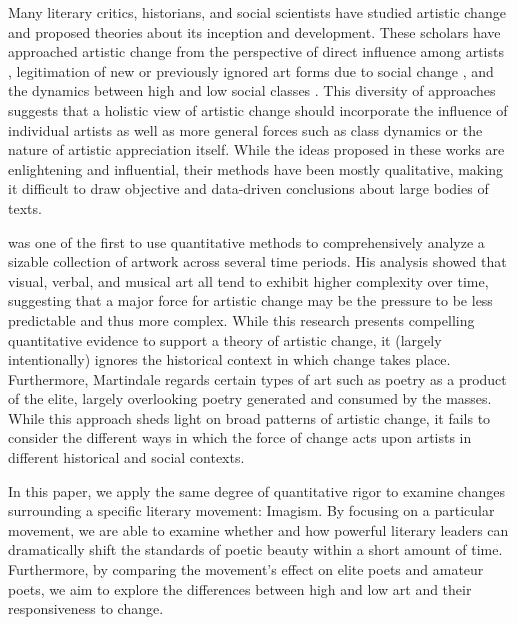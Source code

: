 \documentclass{book}
\begin{document}
Many literary critics, historians, and social scientists have studied artistic change and proposed theories about its inception and development. These scholars have approached artistic change from the perspective of direct influence among artists \citep{clayton1991influence},  legitimation of new or previously ignored art forms due to social change \citep{baumann2007general}, and the dynamics between high and low social classes \citep{simmel1957fashion}. This diversity of approaches suggests that a holistic view of artistic change should incorporate the influence of individual artists as well as more general forces such as class dynamics or the nature of artistic appreciation itself. While the ideas proposed in these works are enlightening and influential, their methods have been mostly qualitative, making it difficult to draw objective and data-driven conclusions about large bodies of texts.

 \cite{martindale1990clockwork} was one of the first to use quantitative methods to comprehensively analyze a sizable collection of artwork across several time periods. His analysis showed that visual, verbal, and musical art all tend to exhibit higher complexity over time, suggesting that a major force for artistic change may be the pressure to be less predictable and thus more complex. While this research presents compelling quantitative evidence to support a theory of artistic change, it (largely intentionally) ignores the  historical context in which change takes place. Furthermore, Martindale regards certain types of art such as poetry as a product of the elite, largely overlooking poetry generated and consumed by the masses. While this approach sheds light on broad patterns of artistic change, it fails to consider the different ways in which the force of change acts upon artists in different historical and social contexts.

In this paper, we apply the same degree of quantitative rigor to examine changes surrounding a specific literary movement: Imagism. By focusing on a particular movement, we are able to examine whether and how powerful literary leaders can dramatically shift the standards of poetic beauty within a short amount of time. Furthermore, by comparing the movement's effect on elite poets and amateur poets, we aim to explore the differences between high and low art and their responsiveness to change. 
\end{document}
